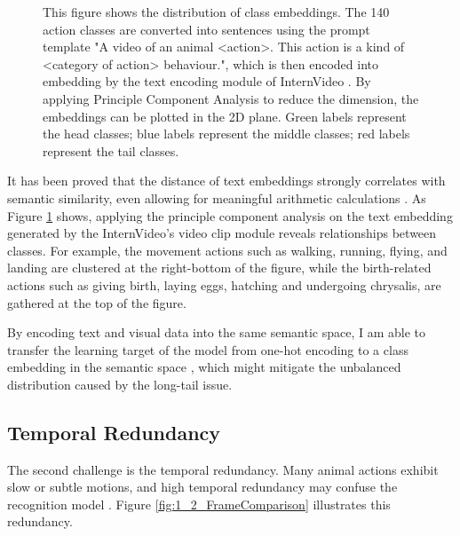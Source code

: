 \begin{figure}[ht]
    \centering
    \caption[Class Embedding Distribution]{This figure shows the distribution of class embeddings. The 140 action classes are converted into sentences using the prompt template "A video of an animal <action>. This action is a kind of <category of action> behaviour.", which is then encoded into embedding by the text encoding module of InternVideo \parencite{wang2022internvideo}. By applying Principle Component Analysis to reduce the dimension, the embeddings can be plotted in the 2D plane. Green labels represent the head classes; blue labels represent the middle classes; red labels represent the tail classes.}
    \label{fig:1_1_ClassEmbeddingInternVideo}
\end{figure}

It has been proved that the distance of text embeddings strongly correlates with semantic similarity, even allowing for meaningful arithmetic calculations \parencite{mikolov2013efficient}. As Figure \ref{fig:1_1_ClassEmbeddingInternVideo} shows, applying the principle component analysis on the text embedding generated by the InternVideo's \parencite{wang2022internvideo} video clip module reveals relationships between classes. For example, the movement actions such as walking, running, flying, and landing are clustered at the right-bottom of the figure, while the birth-related actions such as giving birth, laying eggs, hatching and undergoing chrysalis, are gathered at the top of the figure. 

By encoding text and visual data into the same semantic space, I am able to transfer the learning target of the model from one-hot encoding to a class embedding in the semantic space \parencite{ma2022x}, which might mitigate the unbalanced distribution caused by the long-tail issue. 


\subsection{Temporal Redundancy}
The second challenge is the temporal redundancy. Many animal actions exhibit slow or subtle motions, and high temporal redundancy may confuse the recognition model \parencite{YUAN2018221, li2022uniformer}. Figure \ref{fig:1_2_FrameComparison} illustrates this redundancy. 


